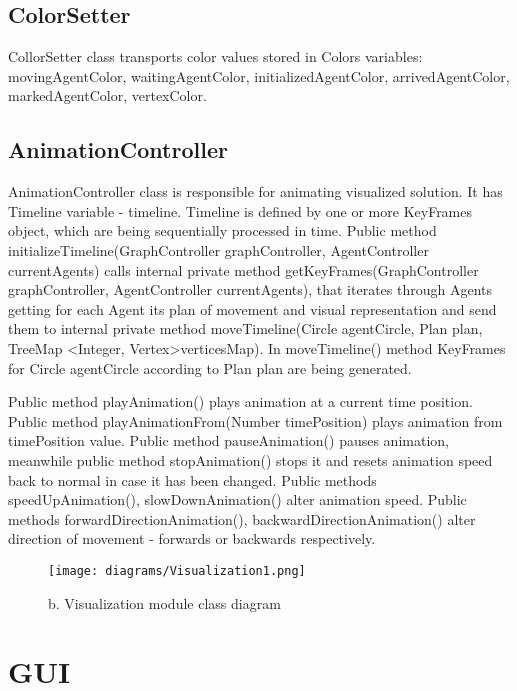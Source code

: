 \documentclass[thesis=B,english]{FITthesis}[2019/12/23]
\begin{document}
\subsection{ColorSetter}

CollorSetter class transports color values stored in Colors variables: movingAgentColor, waitingAgentColor, initializedAgentColor, arrivedAgentColor, markedAgentColor, vertexColor. 

\subsection{AnimationController}

AnimationController class is responsible for animating visualized solution. It has Timeline variable - timeline. Timeline is defined by one or more KeyFrames object, which are being sequentially processed in time. Public method initializeTimeline(GraphController graphController, AgentController currentAgents) calls internal private method getKeyFrames(GraphController graphController, AgentController currentAgents), that iterates through Agents getting for each Agent its plan of movement and visual representation and send them to internal private method moveTimeline(Circle agentCircle, Plan plan, TreeMap \textless Integer, Vertex\textgreater verticesMap). In moveTimeline() method KeyFrames for Circle agentCircle according to Plan plan are being generated.

Public method playAnimation() plays animation at a current time position.
Public method playAnimationFrom(Number timePosition) plays animation from timePosition value. Public method pauseAnimation() pauses animation, meanwhile public method stopAnimation() stops it and resets animation speed back to normal in case it has been changed. Public methods speedUpAnimation(), slowDownAnimation() alter animation speed. Public methods forwardDirectionAnimation(), backwardDirectionAnimation() alter direction of movement - forwards or backwards respectively.


\begin{figure}
	\texttt{[image: diagrams/Visualization1.png]}
	\caption[b. Visualization module class diagram]{b. Visualization module class diagram}\label{fig:float16}
\end{figure}


\section{GUI}
\end{document}
